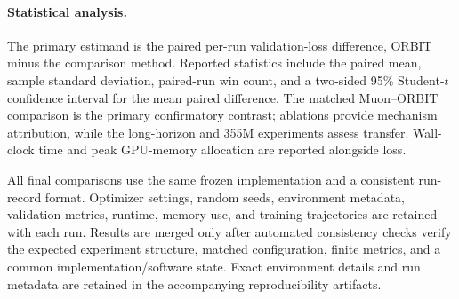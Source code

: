 \paragraph{Statistical analysis.}
The primary estimand is the paired per-run validation-loss difference, ORBIT minus the
comparison method. Reported statistics include the paired mean, sample standard deviation,
paired-run win count, and a two-sided 95\% Student-$t$ confidence interval for the mean
paired difference. The matched Muon--ORBIT comparison is the primary confirmatory contrast;
ablations provide mechanism attribution, while the long-horizon and 355M experiments assess
transfer. Wall-clock time and peak GPU-memory allocation are reported alongside loss.

All final comparisons use the same frozen implementation and a consistent run-record format.
Optimizer settings, random seeds, environment metadata, validation metrics, runtime,
memory use, and training trajectories are retained with each run. Results are merged only
after automated consistency checks verify the expected experiment structure, matched
configuration, finite metrics, and a common implementation/software state. Exact
environment details and run metadata are retained in the accompanying reproducibility
artifacts.
